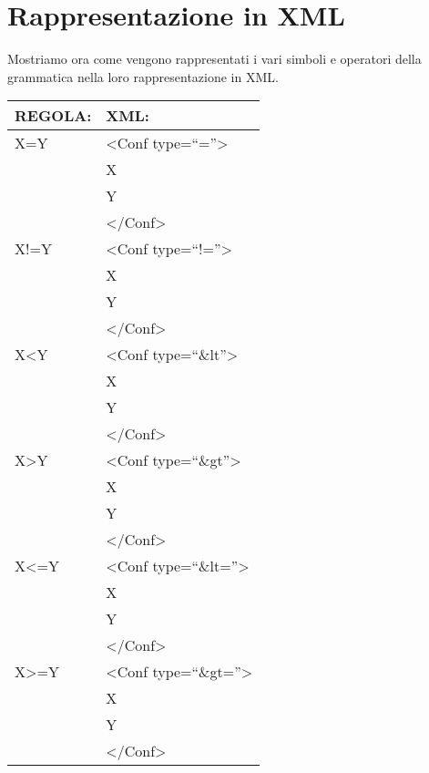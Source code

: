 \section{Rappresentazione in XML}
Mostriamo ora come vengono rappresentati i vari simboli e operatori della grammatica nella loro rappresentazione in XML.
\begin{table}[htbp]
\begin{tabular}{|p{3cm}|p{6.5cm}|}\hline
\textbf{REGOLA:} & \textbf{XML:} \\ \hline
X=Y & \textless Conf type=``=''\textgreater \\
&   X \\
&   Y \\ 
& \textless /Conf\textgreater \\ \hline
X!=Y & \textless Conf type=``!=''\textgreater \\
&  X \\
&  Y \\ 
& \textless /Conf\textgreater\\ \hline
X\textless Y & \textless Conf type=``\&lt''\textgreater \\
&  X \\
&  Y \\ 
& \textless /Conf\textgreater\\ \hline
X\textgreater Y & \textless Conf type=``\&gt''\textgreater \\
&  X \\
&  Y \\ 
& \textless /Conf\textgreater\\ \hline
X\textless=Y & \textless Conf type=``\&lt=''\textgreater \\
&  X \\
&  Y \\ 
& \textless /Conf\textgreater\\ \hline
X\textgreater =Y &  \textless Conf type=``\&gt=''\textgreater \\
&  X \\
&  Y \\ 
& \textless /Conf\textgreater\\ \hline
\end{tabular} \\
\end{table}

